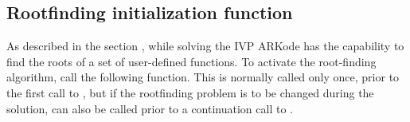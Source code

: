 \documentclass[letterpaper,10pt,english]{sphinxmanual}
\begin{document}
\subsection{Rootfinding initialization function}
\label{c_interface/User_callable:cinterface-rootfinding}\label{c_interface/User_callable:rootfinding-initialization-function}
As described in the section {\hyperref[Mathematics:mathematics-rootfinding]{\emph{}}}, while
solving the IVP ARKode has the capability to find the roots of a set
of user-defined functions.  To activate the root-finding algorithm,
call the following function.  This is normally called only once, prior
to the first call to {\hyperref[c_interface/User_callable:c.ARKode]{\emph{}}}, but if the rootfinding
problem is to be changed during the solution,
{\hyperref[c_interface/User_callable:c.ARKodeRootInit]{\emph{}}} can also be called prior to a continuation
call to {\hyperref[c_interface/User_callable:c.ARKode]{\emph{}}}.
\end{document}

